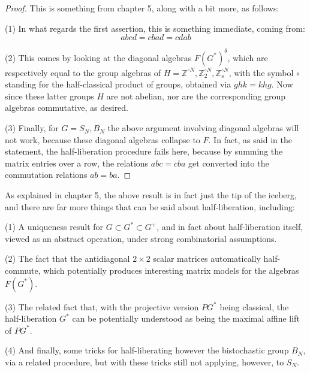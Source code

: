 \documentclass[12pt]{amsbook}
\begin{document}
\begin{proof}
This is something from chapter 5, along with a bit more, as follows:

\medskip

(1) In what regards the first assertion, this is something immediate, coming from:
$$abcd=cbad=cdab$$

(2) This comes by looking at the diagonal algebras $F(G^*)^\delta$, which are respectively equal to the group algebras of $H=\mathbb Z^{\circ N},\mathbb Z_2^{\circ N},\mathbb Z_s^{\circ N}$, with the symbol $\circ$ standing for the half-classical product of groups, obtained via $ghk=khg$. Now since these latter groups $H$ are not abelian, nor are the corresponding group algebras commutative, as desired.

\medskip

(3) Finally, for $G=S_N,B_N$ the above argument involving diagonal algebras will not work, because these diagonal algebras collapse to $F$. In fact, as said in the statement, the half-liberation procedure fails here, because by summing the matrix entries over a row, the relations $abc=cba$ get converted into the commutation relations $ab=ba$.
\end{proof}

As explained in chapter 5, the above result is in fact just the tip of the iceberg, and there are far more things that can be said about half-liberation, including:

\bigskip

(1) A uniqueness result for $G\subset G^*\subset G^+$, and in fact about half-liberation itself, viewed as an abstract operation, under strong combinatorial assumptions.

\bigskip

(2) The fact that the antidiagonal $2\times2$ scalar matrices automatically half-commute, which potentially produces interesting matrix models for the algebras $F(G^*)$.

\bigskip

(3) The related fact that, with the projective version $PG^*$ being classical, the half-liberation $G^*$ can be potentially understood as being the maximal affine lift of $PG^*$.

\bigskip

(4) And finally, some tricks for half-liberating however the bistochastic group $B_N$, via a related procedure, but with these tricks still not applying, however, to $S_N$.

\bigskip
\end{document}
